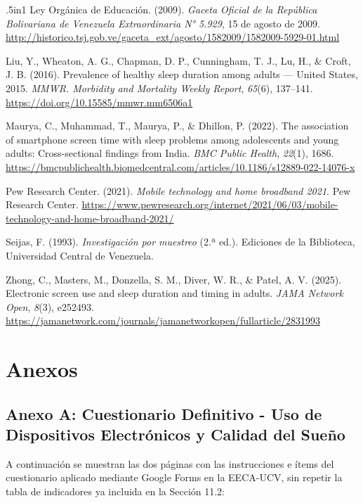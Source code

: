 \documentclass[12pt, letterpaper]{article}
\begin{document}
{\begin{hangparas}{.5in}{1}
Ley Orgánica de Educación. (2009). \textit{Gaceta Oficial de la República Bolivariana de Venezuela Extraordinaria N° 5.929}, 15 de agosto de 2009. \url{http://historico.tsj.gob.ve/gaceta_ext/agosto/1582009/1582009-5929-01.html}

Liu, Y., Wheaton, A. G., Chapman, D. P., Cunningham, T. J., Lu, H., \& Croft, J. B. (2016). Prevalence of healthy sleep duration among adults --- United States, 2015. \textit{MMWR. Morbidity and Mortality Weekly Report}, \textit{65}(6), 137--141. \url{https://doi.org/10.15585/mmwr.mm6506a1}

Maurya, C., Muhammad, T., Maurya, P., \& Dhillon, P. (2022). The association of smartphone screen time with sleep problems among adolescents and young adults: Cross-sectional findings from India. \textit{BMC Public Health}, \textit{22}(1), 1686. \url{https://bmcpublichealth.biomedcentral.com/articles/10.1186/s12889-022-14076-x}

Pew Research Center. (2021). \textit{Mobile technology and home broadband 2021}. Pew Research Center. \url{https://www.pewresearch.org/internet/2021/06/03/mobile-technology-and-home-broadband-2021/}

Seijas, F. (1993). \textit{Investigación por muestreo} (2.ª ed.). Ediciones de la Biblioteca, Universidad Central de Venezuela.

Zhong, C., Masters, M., Donzella, S. M., Diver, W. R., \& Patel, A. V. (2025). Electronic screen use and sleep duration and timing in adults. \textit{JAMA Network Open}, \textit{8}(3), e252493. \url{https://jamanetwork.com/journals/jamanetworkopen/fullarticle/2831993}
\end{hangparas}
}


\newpage
\section{Anexos}

\subsection{Anexo A: Cuestionario Definitivo - Uso de Dispositivos Electrónicos y Calidad del Sueño}

A continuación se muestran las dos páginas con las instrucciones e ítems del cuestionario aplicado mediante Google Forms en la EECA-UCV, sin repetir la tabla de indicadores ya incluida en la Sección 11.2:
\end{document}

